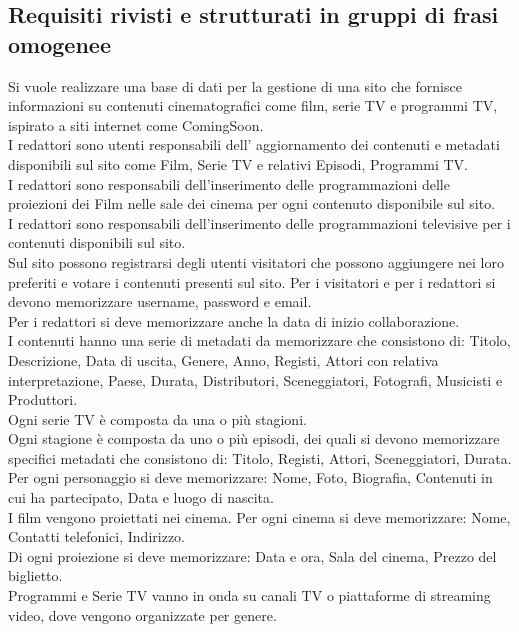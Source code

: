 \documentclass[a4paper]{article}
\begin{document}

\filbreak
\subsection{Requisiti rivisti e strutturati in gruppi di frasi omogenee}

Si vuole realizzare una base di dati per la gestione di una sito che fornisce
informazioni su contenuti cinematografici come film, serie TV e programmi TV, ispirato a siti internet come 
ComingSoon.\\
I redattori sono utenti responsabili dell' aggiornamento dei
contenuti e metadati disponibili sul sito come Film, Serie TV e relativi Episodi, Programmi TV.\\
I redattori sono responsabili dell'inserimento delle programmazioni delle proiezioni dei Film nelle sale dei
 cinema per ogni contenuto disponibile sul sito.\\
I redattori sono responsabili dell'inserimento delle programmazioni televisive per i contenuti disponibili sul sito.\\
Sul sito possono registrarsi degli utenti visitatori che possono aggiungere nei loro preferiti e votare i contenuti presenti sul sito.
Per i visitatori e per i redattori si devono memorizzare username, password e email.\\
Per i redattori si deve memorizzare anche la data di inizio collaborazione.\\
I contenuti hanno una serie di metadati da memorizzare che consistono di:
Titolo, Descrizione, Data di uscita, Genere, Anno, Registi, Attori con relativa interpretazione, 
Paese, Durata, Distributori, Sceneggiatori, Fotografi, Musicisti e Produttori.\\
Ogni serie TV è composta da una o più stagioni.\\
Ogni stagione è composta da uno o più episodi, dei quali si devono memorizzare specifici metadati 
che consistono di: Titolo, Registi, Attori, Sceneggiatori, Durata.\\
Per ogni personaggio si deve memorizzare: Nome, Foto, Biografia, Contenuti in cui ha partecipato,
 Data e luogo di nascita.\\
I film vengono proiettati nei cinema. Per ogni cinema si deve memorizzare: Nome, 
Contatti telefonici, Indirizzo.\\
Di ogni proiezione si deve memorizzare: Data e ora, Sala del cinema, Prezzo del biglietto. \\
Programmi e Serie TV vanno in onda su canali TV o piattaforme di streaming video, 
dove vengono organizzate per genere.\\
\end{document}
